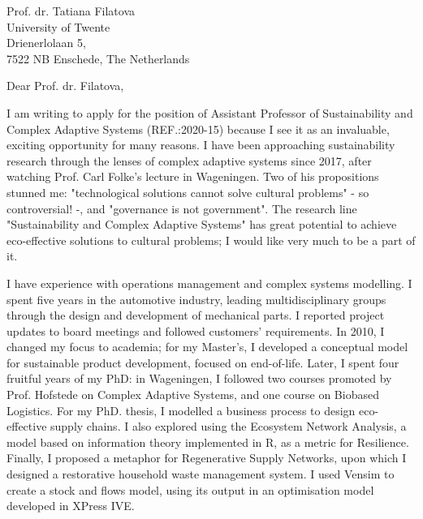 \documentclass[sender,
    paper=a4,
    version=last,
    fontsize=12pt,
    DIV=12,
    BCOR=0mm]{scrlttr2}
\begin{document}

\begin{letter}{
    Prof. dr. Tatiana Filatova \\
    University of Twente\\
    Drienerlolaan 5, \\
    7522 NB Enschede, The Netherlands
} 

\opening{Dear Prof. dr. Filatova,}

\parindent8mm

I am writing to apply for the position of Assistant Professor of Sustainability and Complex Adaptive Systems (REF.:2020-15) because I see it as an invaluable, exciting opportunity for many reasons. I have been approaching sustainability research through the lenses of complex adaptive systems since 2017, after watching Prof. Carl Folke's lecture in Wageningen. Two of his propositions stunned me: "technological solutions cannot solve cultural problems" - so controversial! -, and "governance is not government". The research line "Sustainability and Complex Adaptive Systems" has great potential to achieve eco-effective solutions to cultural problems; I would like very much to be a part of it. 

I have experience with operations management and complex systems modelling. I spent five years in the automotive industry, leading multidisciplinary groups through the design and development of mechanical parts. I reported project updates to board meetings and followed customers' requirements. In 2010, I changed my focus to academia; for my Master's, I developed a conceptual model for sustainable product development, focused on end-of-life. Later, I spent four fruitful years of my PhD: in Wageningen, I followed two courses promoted by Prof. Hofstede on Complex Adaptive Systems, and one course on Biobased Logistics. For my PhD. thesis, I modelled a business process to design eco-effective supply chains. I also explored using the Ecosystem Network Analysis, a model based on information theory implemented in R, as a metric for Resilience. Finally, I proposed a metaphor for Regenerative Supply Networks, upon which I designed a restorative household waste management system. I used Vensim to create a stock and flows model, using its output in an optimisation model developed in XPress IVE. 


\end{letter}
\end{document}
